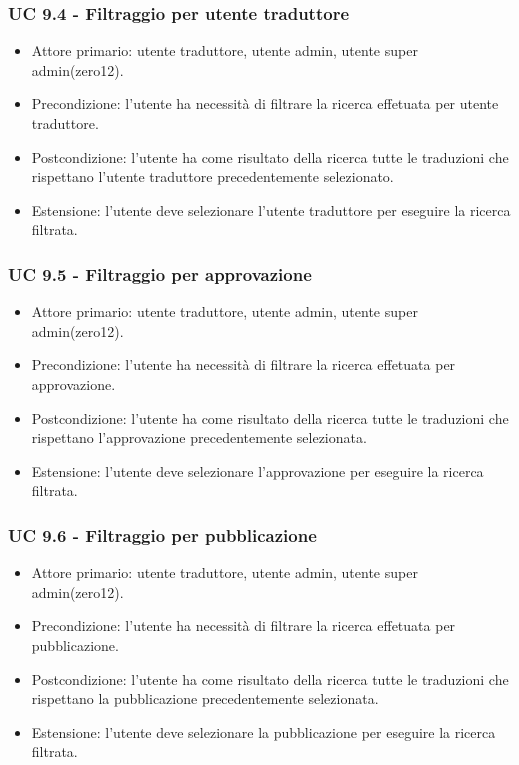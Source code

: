    \subsubsection{UC 9.4 - Filtraggio per utente traduttore}
        \begin{itemize}
            \item Attore primario: utente traduttore, utente admin, utente super admin(zero12).
            \item Precondizione: l'utente ha necessità di filtrare la ricerca effetuata per utente traduttore.
            \item Postcondizione: l'utente ha come risultato della ricerca tutte le traduzioni che rispettano l'utente traduttore precedentemente selezionato. 
            \item Estensione: l'utente deve selezionare l'utente traduttore per eseguire la ricerca filtrata.
        \end{itemize}  
    \subsubsection{UC 9.5 - Filtraggio per approvazione}
        \begin{itemize}
            \item Attore primario: utente traduttore, utente admin, utente super admin(zero12).
            \item Precondizione: l'utente ha necessità di filtrare la ricerca effetuata per approvazione.
            \item Postcondizione: l'utente ha come risultato della ricerca tutte le traduzioni che rispettano l'approvazione precedentemente selezionata. 
            \item Estensione: l'utente deve selezionare l'approvazione per eseguire la ricerca filtrata.
        \end{itemize}  
    \subsubsection{UC 9.6 - Filtraggio per pubblicazione}
        \begin{itemize}
            \item Attore primario: utente traduttore, utente admin, utente super admin(zero12).
            \item Precondizione: l'utente ha necessità di filtrare la ricerca effetuata per pubblicazione.
            \item Postcondizione: l'utente ha come risultato della ricerca tutte le traduzioni che rispettano la pubblicazione precedentemente selezionata. 
            \item Estensione: l'utente deve selezionare la pubblicazione per eseguire la ricerca filtrata.
        \end{itemize} 
